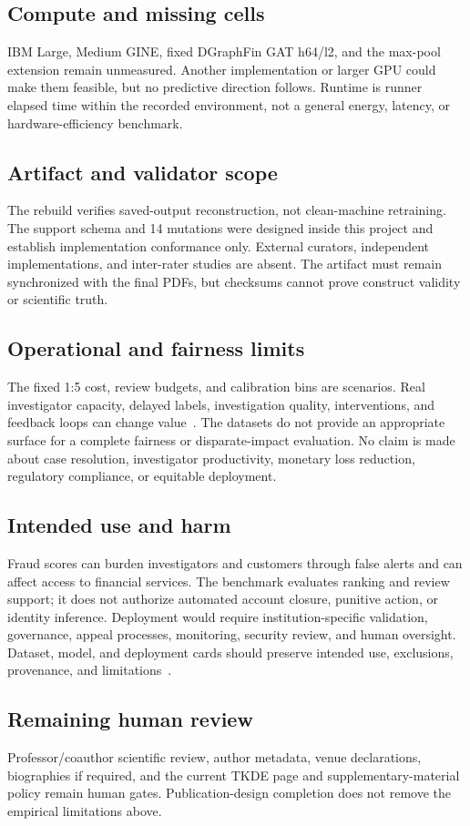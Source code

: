 \subsection{Compute and missing cells}

IBM Large, Medium GINE, fixed DGraphFin GAT h64/l2, and the max-pool extension remain unmeasured. Another implementation or larger GPU could make them feasible, but no predictive direction follows. Runtime is runner elapsed time within the recorded environment, not a general energy, latency, or hardware-efficiency benchmark.

\subsection{Artifact and validator scope}

The rebuild verifies saved-output reconstruction, not clean-machine retraining. The support schema and 14 mutations were designed inside this project and establish implementation conformance only. External curators, independent implementations, and inter-rater studies are absent. The artifact must remain synchronized with the final PDFs, but checksums cannot prove construct validity or scientific truth.

\subsection{Operational and fairness limits}

The fixed 1:5 cost, review budgets, and calibration bins are scenarios. Real investigator capacity, delayed labels, investigation quality, interventions, and feedback loops can change value~\cite{siddiqui2018feedback}. The datasets do not provide an appropriate surface for a complete fairness or disparate-impact evaluation. No claim is made about case resolution, investigator productivity, monetary loss reduction, regulatory compliance, or equitable deployment.

\subsection{Intended use and harm}

Fraud scores can burden investigators and customers through false alerts and can affect access to financial services. The benchmark evaluates ranking and review support; it does not authorize automated account closure, punitive action, or identity inference. Deployment would require institution-specific validation, governance, appeal processes, monitoring, security review, and human oversight. Dataset, model, and deployment cards should preserve intended use, exclusions, provenance, and limitations~\cite{gebru2021datasheets,mitchell2019modelcards,pushkarna2022datacards}.

\subsection{Remaining human review}

Professor/coauthor scientific review, author metadata, venue declarations, biographies if required, and the current TKDE page and supplementary-material policy remain human gates. Publication-design completion does not remove the empirical limitations above.
